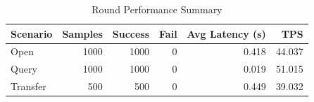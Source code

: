 \begin{table}
\caption{Round Performance Summary}
\label{tab:round_perf}
\begin{tabular}{lrrrrr}
\toprule
Scenario & Samples & Success & Fail & Avg Latency (s) & TPS \\
\midrule
Open & 1000 & 1000 & 0 & 0.418 & 44.037 \\
Query & 1000 & 1000 & 0 & 0.019 & 51.015 \\
Transfer & 500 & 500 & 0 & 0.449 & 39.032 \\
\bottomrule
\end{tabular}
\end{table}
